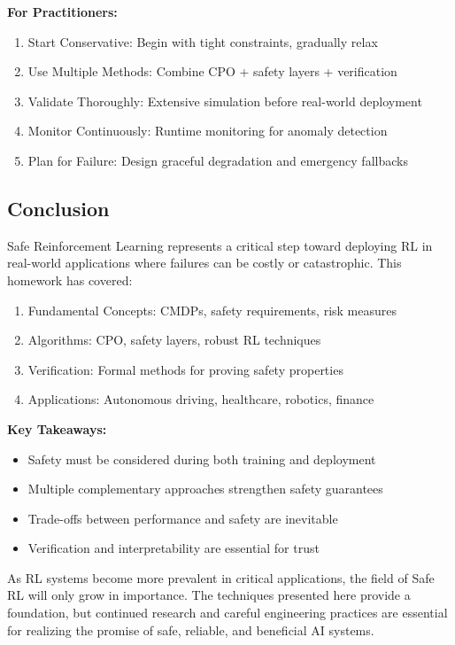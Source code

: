 \documentclass[12pt]{article}
\begin{document}
{{{{\textbf{For Practitioners:}
\begin{enumerate}
\item Start Conservative: Begin with tight constraints, gradually relax
\item Use Multiple Methods: Combine CPO + safety layers + verification
\item Validate Thoroughly: Extensive simulation before real-world deployment
\item Monitor Continuously: Runtime monitoring for anomaly detection
\item Plan for Failure: Design graceful degradation and emergency fallbacks
\end{enumerate}

\subsection{Conclusion}

Safe Reinforcement Learning represents a critical step toward deploying RL in real-world applications where failures can be costly or catastrophic. This homework has covered:

\begin{enumerate}
\item Fundamental Concepts: CMDPs, safety requirements, risk measures
\item Algorithms: CPO, safety layers, robust RL techniques
\item Verification: Formal methods for proving safety properties
\item Applications: Autonomous driving, healthcare, robotics, finance
\end{enumerate}

\textbf{Key Takeaways:}
\begin{itemize}
\item Safety must be considered during both training and deployment
\item Multiple complementary approaches strengthen safety guarantees
\item Trade-offs between performance and safety are inevitable
\item Verification and interpretability are essential for trust
\end{itemize}

As RL systems become more prevalent in critical applications, the field of Safe RL will only grow in importance. The techniques presented here provide a foundation, but continued research and careful engineering practices are essential for realizing the promise of safe, reliable, and beneficial AI systems.




}}}}
\end{document}
